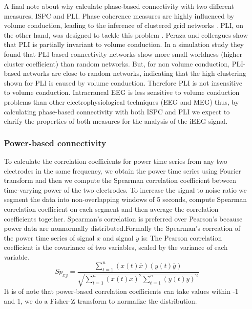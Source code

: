 \documentclass[11pt, onecolumn]{article}
\begin{document}
A final note about why calculate phase-based connectivity with two different measures, ISPC and PLI. Phase coherence measures are highly influenced by volume conduction, leading to the inference of clustered grid networks \citep{mormann2000mean}. PLI, on the other hand, was designed to tackle this problem \cite{stam2007phase}. Peraza and colleagues \citep{peraza2012volume} show that PLI is partially invariant to volume conduction. In a simulation study they found that PLI-based connectivity networks show more small worldness (higher cluster coefficient) than random networks. But, for non volume conduction, PLI-based networks are close to random networks, indicating that the high clustering shown for PLI is caused by volume conduction. Therefore PLI is not insensitive to volume conduction. Intracraneal EEG is less sensitive to volume conduction problems than other electrophysiological techniques (EEG and MEG) thus, by calculating phase-based connectivity with both ISPC and PLI we expect to clarify the properties of both measures for the analysis of the iEEG signal.
\subsubsection{Power-based connectivity}
To calculate the correlation coefficients for power time series from any two electrodes in the same frequency, we obtain the power time series using Fourier transform and then we compute the Spearman correlation coefficient between time-varying power of the two electrodes. To increase the signal to noise ratio we segment the data into non-overlapping windows of 5 seconds, compute Spearman correlation coefficient on each segment and then average the correlation coefficients together. Spearman's correlation is preferred over Pearson's because power data are 
nonnormally distributed.Formally the Spearman's correation of the power time series of signal $x$ and signal $y$ is:
The Pearson correlation coefficient is the covariance of two variables, scaled by the variance of each variable. 
\begin{equation}
Sp_{xy} = \frac{\sum_{t=1}^{n}(x(t) \bar{x})(y(t) \bar{y})}{\sqrt{{\sum_{t=1}^{n}(x(t) \bar{x})^2}{\sum_{t=1}^{n}(y(t) \bar{y})^2}}}
\label{eq:pli}
\end{equation}
It is of note that power-based correlation coefficients can take values within -1 and 1, we do a Fisher-Z transform to normalize the distribution.
\end{document}
